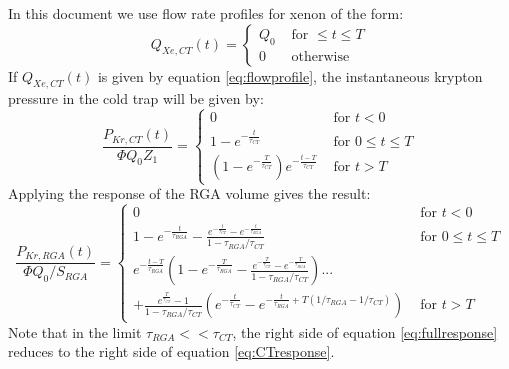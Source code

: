 \documentclass[12pt]{article}
\begin{document}
In this document we use flow rate profiles for xenon of the form:
\begin{equation}
\label{eq:flowprofile}
Q_{Xe,CT}(t) =
  \begin{cases}
    Q_0&\textrm{ for } \leq t\leq T\\
    0     &\textrm{ otherwise}
  \end{cases}
\end{equation}
If $Q_{Xe,CT}(t)$ is given by equation \ref{eq:flowprofile}, the instantaneous krypton pressure in the cold trap will be given by: 
\begin{equation}
\label{eq:CTresponse}
\frac{P_{Kr,CT}(t)}{\Phi Q_0Z_1}=
\begin{cases}
0 & \textrm{ for } t<0\\
1-e^{-\frac{t}{\tau_{CT}}} & \textrm{ for } 0\leq t \leq T\\
(1-e^{-\frac{T}{\tau_{CT}}})e^{-\frac{t-T}{\tau_{CT}}}& \textrm{ for }  t > T
\end{cases}
\end{equation} 
Applying the response of the RGA volume gives the result:
\begin{equation}
\label{eq:fullresponse}
\frac{P_{Kr,RGA}(t)}{\Phi Q_0 /S_{RGA}}=
\begin{cases}
0 & \textrm{ for } t<0\\
1-e^{-\frac{t}{\tau_{RGA}}}-\frac{e^{-\frac{t}{\tau_{CT}}}-e^{-\frac{t}{\tau_{RGA}}}}{1-\tau_{RGA}/\tau_{CT}} & \textrm{ for } 0\leq t \leq T\\
e^{-\frac{t-T}{\tau_{RGA}}}(1-e^{-\frac{T}{\tau_{RGA}}}-\frac{e^{-\frac{T}{\tau_{CT}}}-e^{-\frac{T}{\tau_{RGA}}}}{1-\tau_{RGA}/\tau_{CT}} ) ...\\
 +\frac{e^{\frac{T}{\tau_{CT}}}-1}{1-\tau_{RGA}/\tau_{CT}}(e^{-\frac{t}{\tau_{CT}}}-e^{-\frac{t}{\tau_{RGA}}+T(1/\tau_{RGA}-1/\tau_{CT})}) & \textrm{ for }  t > T
\end{cases}
\end{equation} 
Note that in the limit $\tau_{RGA}<<\tau_{CT}$, the right side of equation \ref{eq:fullresponse} reduces to the right side of equation \ref{eq:CTresponse}.
\end{document}
